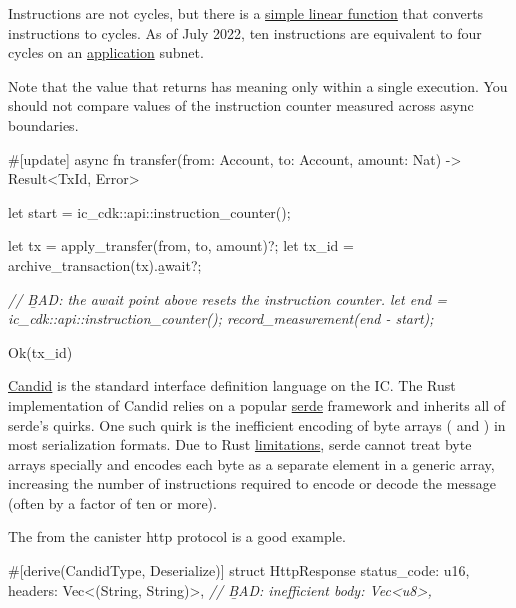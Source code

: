 \documentclass{article}
\begin{document}
Instructions are not cycles, but there is a \href{https://github.com/dfinity/ic/blob/c01d7d1b2e18490a2f70d2fdf5b6aceccab5860c/rs/cycles_account_manager/src/lib.rs#L730-L738}{simple linear function} that converts instructions to cycles.
As of July 2022, ten instructions are equivalent to four cycles on an \href{https://github.com/dfinity/ic/blob/7d3fb4ef01416241205818450156aabd21c24b34/rs/config/src/subnet_config.rs#L288-L289}{application} subnet.

Note that the value that  returns has meaning only within a single execution.
You should not compare values of the instruction counter measured across async boundaries.

\begin{code}[bad]
#[update]
async fn transfer(from: Account, to: Account, amount: Nat) -> Result<TxId, Error> {
  let start = ic_cdk::api::instruction_counter();

  let tx = apply_transfer(from, to, amount)?;
  let tx_id = archive_transaction(tx).\b{await}?;

  \em{// \b{BAD}: the await point above resets the instruction counter.}
  let end = ic_cdk::api::instruction_counter();
  record_measurement(end - start);

  Ok(tx_id)
}
\end{code}


\href{https://github.com/dfinity/candid}{Candid} is the standard interface definition language on the IC.
The Rust implementation of Candid relies on a popular \href{https://serde.rs/}{serde} framework and inherits all of serde's quirks.
One such quirk is the inefficient encoding of byte arrays ( and \code{\[u8\]}) in most serialization formats.
Due to Rust \href{https://rust-lang.github.io/rfcs/1210-impl-specialization.html}{limitations}, serde cannot treat byte arrays specially and encodes each byte as a separate element in a generic array, increasing the number of instructions required to encode or decode the message (often by a factor of ten or more).

The  from the canister http protocol is a good example.

\begin{code}[bad]
#[derive(CandidType, Deserialize)]
struct HttpResponse {
    status_code: u16,
    headers: Vec<(String, String)>,
    \em{// \b{BAD}: inefficient}
    body: Vec<u8>,
}
\end{code}
\end{document}
